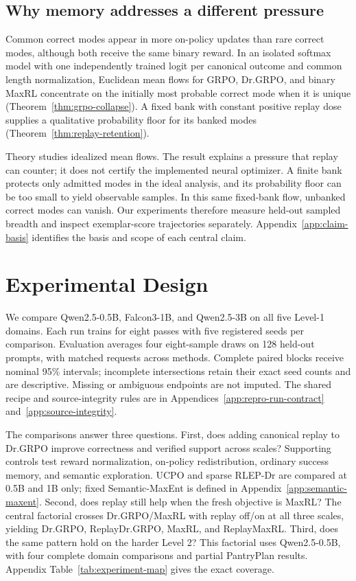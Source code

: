 \documentclass{article}
\newcommand{\1}{\mathbf 1}
\theoremstyle{remark}
\theoremstyle{definition}
\theoremstyle{plain}
\begin{document}
\subsection{Why memory addresses a different pressure}
\label{sec:collapse-mechanism}

Common correct modes appear in more on-policy updates than rare correct modes,
although both receive the same binary reward. In an isolated softmax model
with one independently trained logit per canonical outcome and common
length normalization, Euclidean mean flows for GRPO, Dr.GRPO, and binary
MaxRL concentrate on the initially most probable correct mode when it is
unique (Theorem~\ref{thm:grpo-collapse}). A fixed bank with constant positive
replay dose supplies a qualitative probability floor for its banked modes
(Theorem~\ref{thm:replay-retention}).

Theory studies idealized mean flows. The result explains a pressure that replay
can counter; it does not certify the implemented neural optimizer. A finite
bank protects only admitted modes in the ideal analysis, and its probability
floor can be too small to yield observable samples. In this same fixed-bank
flow, unbanked correct modes can vanish. Our experiments therefore measure
held-out sampled breadth and inspect exemplar-score trajectories separately.
Appendix~\ref{app:claim-basis} identifies the basis and scope of each central claim.

\section{Experimental Design}
\label{sec:experiments}
\label{sec:shared-protocol}

We compare Qwen2.5-0.5B, Falcon3-1B, and Qwen2.5-3B on all five Level-1 domains.
Each run trains for eight passes with five registered seeds per comparison.
Evaluation averages four eight-sample draws on 128 held-out prompts, with
matched requests across methods. Complete paired blocks receive nominal
95\% intervals; incomplete intersections retain their exact seed counts and
are descriptive. Missing or ambiguous endpoints are not imputed. The shared
recipe and source-integrity rules are in
Appendices~\ref{app:repro-run-contract} and~\ref{app:source-integrity}.

\label{sec:retention-design}
The comparisons answer three questions. First, does adding canonical replay
to Dr.GRPO improve correctness and verified support across scales? Supporting
controls test reward normalization, on-policy redistribution, ordinary success
memory, and semantic exploration. UCPO and sparse RLEP-Dr are compared at
0.5B and 1B only; fixed Semantic-MaxEnt is defined in
Appendix~\ref{app:semantic-maxent}. Second, does replay still help when the
fresh objective is MaxRL?
\label{sec:factorial-design}
The central factorial crosses Dr.GRPO/MaxRL with replay off/on at all three
scales, yielding Dr.GRPO, ReplayDr.GRPO, MaxRL, and ReplayMaxRL.
Third, does the same pattern hold on the harder Level 2? This factorial uses
Qwen2.5-0.5B, with four complete domain comparisons and partial PantryPlan
results. Appendix Table~\ref{tab:experiment-map} gives the exact coverage.
\end{document}
